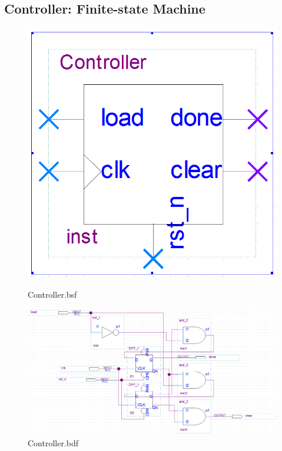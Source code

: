 \documentclass[12pt,a4paper]{article}
\begin{document}
  \subsection{Controller: Finite-state Machine}
  \begin{figure}[H]
    \centering
    \begin{subcaptionblock}{0.19\linewidth}
      \includegraphics[width=\linewidth]{Lab2_3/Controller_bsf.png}
      \caption{Controller.bsf}
    \end{subcaptionblock}
    \begin{subcaptionblock}{0.8\linewidth}
      \includegraphics[width=\linewidth]{Lab2_3/Controller_bdf.png}
      \caption{Controller.bdf}
    \end{subcaptionblock}
  \end{figure}
\end{document}
